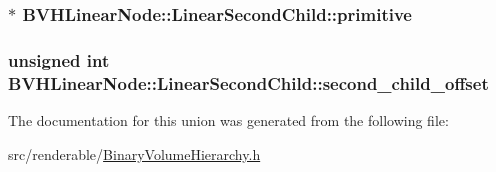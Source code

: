 \subsubsection[{\texorpdfstring{primitive}{primitive}}]{$\ast$ B\+V\+H\+Linear\+Node\+::\+Linear\+Second\+Child\+::primitive}\hypertarget{unionBVHLinearNode_1_1LinearSecondChild_ac8489c14e68bc1f8fee2cdf842199e61}{}\label{unionBVHLinearNode_1_1LinearSecondChild_ac8489c14e68bc1f8fee2cdf842199e61}
\subsubsection[{\texorpdfstring{second\+\_\+child\+\_\+offset}{second_child_offset}}]{\setlength{\rightskip}{0pt plus 5cm}unsigned int B\+V\+H\+Linear\+Node\+::\+Linear\+Second\+Child\+::second\+\_\+child\+\_\+offset}\hypertarget{unionBVHLinearNode_1_1LinearSecondChild_ac0a41d4aa3236a1f51741467112ee9ba}{}\label{unionBVHLinearNode_1_1LinearSecondChild_ac0a41d4aa3236a1f51741467112ee9ba}


The documentation for this union was generated from the following file\+:\begin{DoxyCompactItemize}
\item 
src/renderable/\hyperlink{BinaryVolumeHierarchy_8h}{Binary\+Volume\+Hierarchy.\+h}\end{DoxyCompactItemize}
